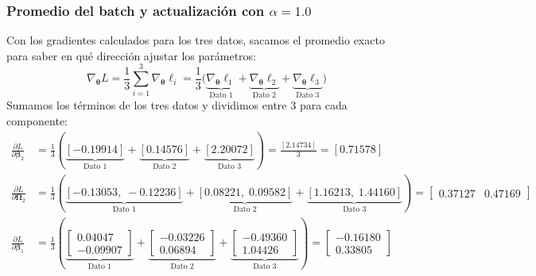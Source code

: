 \documentclass[10pt,a4paper]{article}
\begin{document}
{\setlength{\abovedisplayskip}{1.5pt}\setlength{\belowdisplayskip}{1.5pt}\setlength{\jot}{0pt}
\vspace{-4pt}
\subsubsection*{Promedio del batch y actualización con $\alpha = 1.0$}
\vspace{-2pt}

Con los gradientes calculados para los tres datos, sacamos el promedio exacto para saber en qué dirección ajustar los parámetros:
\[
\nabla_{\boldsymbol{\theta}} L = \frac{1}{3} \sum_{i=1}^3 \nabla_{\boldsymbol{\theta}} \ell_i = \frac{1}{3} \Big( \underbrace{\nabla_{\boldsymbol{\theta}} \ell_1}_{\text{Dato 1}} + \underbrace{\nabla_{\boldsymbol{\theta}} \ell_2}_{\text{Dato 2}} + \underbrace{\nabla_{\boldsymbol{\theta}} \ell_3}_{\text{Dato 3}} \Big)
\]
Sumamos los términos de los tres datos y dividimos entre 3 para cada componente:
\begin{align*}
\frac{\partial L}{\partial \boldsymbol{\beta}_2} &= \frac{1}{3}\left( \underbrace{[-0.19914]}_{\text{Dato 1}} + \underbrace{[0.14576]}_{\text{Dato 2}} + \underbrace{[2.20072]}_{\text{Dato 3}} \right) = \frac{[2.14734]}{3} = \mathbf{[0.71578]} \\
\frac{\partial L}{\partial \boldsymbol{\Omega}_2} &= \frac{1}{3}\left( \underbrace{[-0.13053, \; -0.12236]}_{\text{Dato 1}} + \underbrace{[0.08221, \; 0.09582]}_{\text{Dato 2}} + \underbrace{[1.16213, \; 1.44160]}_{\text{Dato 3}} \right) = \mathbf{\begin{bmatrix} 0.37127 & 0.47169 \end{bmatrix}} \\
\frac{\partial L}{\partial \boldsymbol{\beta}_1} &= \frac{1}{3}\left( \underbrace{\begin{bmatrix} 0.04047 \\ -0.09907 \end{bmatrix}}_{\text{Dato 1}} + \underbrace{\begin{bmatrix} -0.03226 \\ 0.06894 \end{bmatrix}}_{\text{Dato 2}} + \underbrace{\begin{bmatrix} -0.49360 \\ 1.04426 \end{bmatrix}}_{\text{Dato 3}} \right) = \mathbf{\begin{bmatrix} -0.16180 \\ 0.33805 \end{bmatrix}} \\

\end{align*}}
\end{document}
